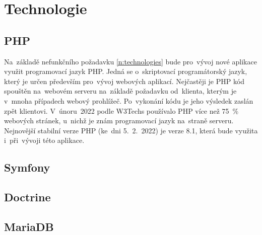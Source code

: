 \section{Technologie}

\subsection{PHP}
Na~základě nefunkčního požadavku \ref{n:technologies} bude pro~vývoj nové aplikace využit programovací jazyk PHP. Jedná se o~skriptovací programátorský jazyk, který je určen především pro~vývoj webových aplikací. Nejčastěji je PHP kód spouštěn na~webovém serveru na~základě požadavku od~klienta, kterým je v~mnoha případech webový prohlížeč. Po~vykonání kódu je jeho výsledek zaslán zpět klientovi. \cite{php_intro_1, php_intro_2} V~únoru~2022 podle W3Techs používalo PHP více než 75~\% webových stránek, u~nichž je znám programovací jazyk na~straně serveru. \cite{php_w3techs} Nejnovější stabilní verze PHP (ke~dni 5.~2.~2022) je verze 8.1\cite{php_version}, která bude využita i~při~vývoji této aplikace.

\subsection{Symfony}

\subsection{Doctrine}

\subsection{MariaDB}

